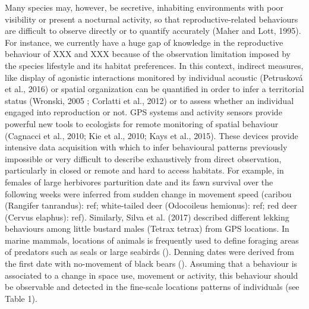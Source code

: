 \documentclass[a4paper,11pt]{article}
\begin{document}
Many species may, however, be secretive, inhabiting environments with poor visibility or present a nocturnal activity, so that reproductive-related behaviours are difficult to observe directly or to quantify accurately (Maher and Lott, 1995). For instance, we currently have a huge gap of knowledge in the reproductive behaviour of XXX and XXX because of the observation limitation imposed by the species lifestyle and its habitat preferences. In this context, indirect measures, like display of agonistic interactions monitored by individual acoustic (Petrusková et al., 2016) or spatial organization can be quantified in order to infer a territorial status (Wronski, 2005 ; Corlatti et al., 2012) or to assess whether an individual engaged into reproduction or not. GPS systems and activity sensors provide powerful new tools to ecologists for remote monitoring of spatial behaviour (Cagnacci et al., 2010; Kie et al., 2010; Kays et al., 2015). These devices provide intensive data acquisition with which to infer behavioural patterns previously impossible or very difficult to describe exhaustively from direct observation, particularly in closed or remote and hard to access habitats. For example, in females of large herbivores parturition date and its fawn survival over the following weeks were inferred from sudden change in movement speed (caribou (Rangifer tanrandus): ref; white-tailed deer (Odocoileus hemionus): ref; red deer (Cervus elaphus): ref). Similarly, Silva et al. (2017) described different lekking behaviours among little bustard males (Tetrax tetrax) from GPS locations. In marine mammals, locations of animals is frequently used to define foraging areas of predators such as seals or large seabirds (). Denning dates were derived from the first date with no-movement of black bears (). Assuming that a behaviour is associated to a change in space use, movement or activity, this behaviour should be observable and detected in the fine-scale locations patterns of individuals (see Table 1).
\end{document}
